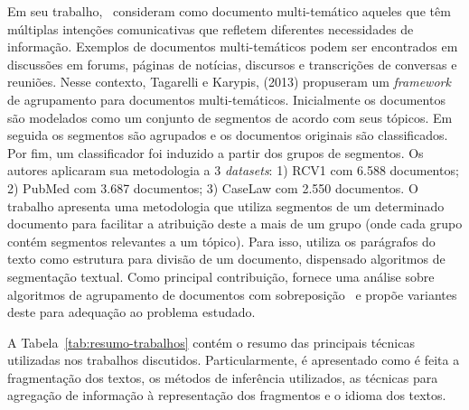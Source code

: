 Em seu trabalho,~\cite{Tagarelli2013} consideram como documento multi-temático aqueles que têm múltiplas intenções comunicativas que refletem diferentes necessidades de informação.
Exemplos de documentos multi-temáticos podem ser encontrados em discussões em forums, páginas de notícias, discursos e transcrições de conversas e reuniões. Nesse contexto, Tagarelli e Karypis, (2013) propuseram um \textit{framework} de agrupamento para documentos multi-temáticos. %
Inicialmente os documentos são modelados como um conjunto de segmentos de acordo com seus tópicos. Em seguida os segmentos são agrupados e os documentos originais são classificados. Por fim, um classificador foi induzido a partir dos grupos de segmentos.
Os autores aplicaram sua metodologia a 3 \textit{datasets}: 1) RCV1 com 6.588 documentos; 2) PubMed com 3.687 documentos; 3) CaseLaw com 2.550 documentos. 
O trabalho apresenta uma metodologia que utiliza segmentos de um determinado documento para facilitar a atribuição deste a mais de um grupo (onde cada grupo contém segmentos relevantes a um tópico). Para isso, utiliza os parágrafos do texto como estrutura para divisão de um documento, dispensado algoritmos de segmentação textual. Como principal contribuição, fornece uma análise sobre algoritmos de agrupamento de documentos com sobreposição~\cite{Zhao2004a, Zhao2004b, Dhillon2001} e propõe variantes deste para adequação ao problema estudado. 







A Tabela~\ref{tab:resumo-trabalhos} contém o resumo das principais técnicas utilizadas nos trabalhos discutidos. Particularmente, é apresentado como é feita a fragmentação dos textos, os métodos de inferência utilizados, as técnicas para agregação de informação à representação dos fragmentos e o idioma dos textos.




